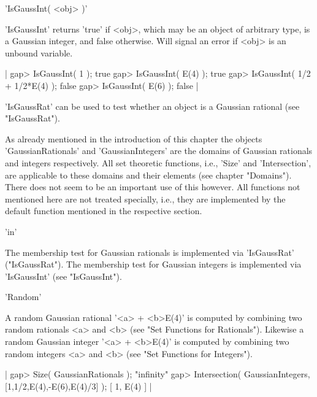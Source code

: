 'IsGaussInt( <obj> )'

'IsGaussInt' returns 'true' if <obj>, which may be an object of arbitrary
type, is  a Gaussian integer, and  false otherwise.  Will signal an error
if <obj> is an unbound variable.

|    gap> IsGaussInt( 1 );
    true
    gap> IsGaussInt( E(4) );
    true
    gap> IsGaussInt( 1/2 + 1/2*E(4) );
    false
    gap> IsGaussInt( E(6) );
    false |

'IsGaussRat' can be used to test whether an object is a Gaussian rational
(see "IsGaussRat").

%
%
%

As  already mentioned in the  introduction of  this  chapter the  objects
'GaussianRationals'  and 'GaussianIntegers' are the  domains of  Gaussian
rationals and integers respectively.  All  set theoretic functions, i.e.,
'Size' and 'Intersection',  are applicable to  these  domains  and  their
elements (see chapter "Domains").  There does not seem to be an important
use of  this however.  All functions not  mentioned here are  not treated
specially, i.e., they are implemented by the  default function  mentioned
in the respective section.

\vspace{5mm}
'in'

The  membership test   for     Gaussian rationals  is  implemented    via
'IsGaussRat' ("IsGaussRat").  The  membership test for  Gaussian integers
is implemented via 'IsGaussInt' (see "IsGaussInt").

\vspace{5mm}
'Random'

A random Gaussian rational '<a> + <b>\*E(4)' is computed by combining two
random  rationals  <a>  and  <b>  (see  "Set  Functions  for Rationals").
Likewise  a  random  Gaussian  integer '<a> +  <b>\*E(4)' is  computed by
combining  two random  integers  <a>  and  <b> (see  "Set  Functions  for
Integers").

|    gap> Size( GaussianRationals );
    "infinity"
    gap> Intersection( GaussianIntegers, [1,1/2,E(4),-E(6),E(4)/3] );
    [ 1, E(4) ] |

%
%
%

